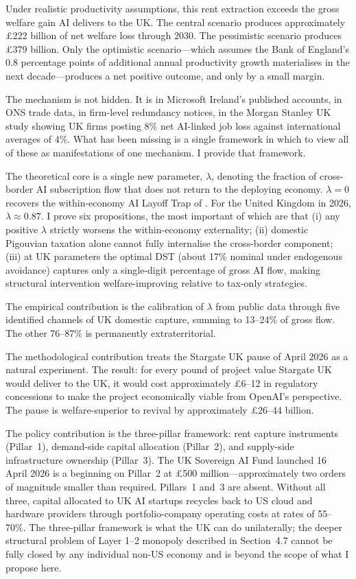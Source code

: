 \documentclass[11pt,letterpaper]{article}
\theoremstyle{remark}
\begin{document}
Under realistic productivity assumptions, this rent extraction exceeds the gross welfare gain {AI} delivers to the {UK}. The central scenario produces approximately \pounds222 billion of net welfare loss through 2030. The pessimistic scenario produces \pounds379 billion. Only the optimistic scenario---which assumes the Bank of England's 0.8 percentage points of additional annual productivity growth materialises in the next decade---produces a net positive outcome, and only by a small margin.

The mechanism is not hidden. It is in Microsoft Ireland's published accounts, in {ONS} trade data, in firm-level redundancy notices, in the Morgan Stanley {UK} study showing {UK} firms posting 8\% net {AI}-linked job loss against international averages of 4\%. What has been missing is a single framework in which to view all of these as manifestations of one mechanism. I provide that framework.

The theoretical core is a single new parameter, $\lambda$, denoting the fraction of cross-border {AI} subscription flow that does not return to the deploying economy. $\lambda = 0$ recovers the within-economy {AI} Layoff Trap of \citet{hemenway_falk_tsoukalas_2026}. For the United Kingdom in 2026, $\lambda \approx 0.87$. I prove six propositions, the most important of which are that (i) any positive $\lambda$ strictly worsens the within-economy externality; (ii) domestic Pigouvian taxation alone cannot fully internalise the cross-border component; (iii) at {UK} parameters the optimal {DST} (about 17\% nominal under endogenous avoidance) captures only a single-digit percentage of gross {AI} flow, making structural intervention welfare-improving relative to tax-only strategies.

The empirical contribution is the calibration of $\lambda$ from public data through five identified channels of {UK} domestic capture, summing to 13--24\% of gross flow. The other 76--87\% is permanently extraterritorial.

The methodological contribution treats the Stargate {UK} pause of April 2026 as a natural experiment. The result: for every pound of project value Stargate {UK} would deliver to the {UK}, it would cost approximately \pounds6--12 in regulatory concessions to make the project economically viable from OpenAI's perspective. The pause is welfare-superior to revival by approximately \pounds26--44 billion.

The policy contribution is the three-pillar framework: rent capture instruments (Pillar~1), demand-side capital allocation (Pillar~2), and supply-side infrastructure ownership (Pillar~3). The {UK} Sovereign {AI} Fund launched 16 April 2026 is a beginning on Pillar~2 at \pounds500 million---approximately two orders of magnitude smaller than required. Pillars~1 and~3 are absent. Without all three, capital allocated to {UK} {AI} startups recycles back to {US} cloud and hardware providers through portfolio-company operating costs at rates of 55--70\%. The three-pillar framework is what the {UK} can do unilaterally; the deeper structural problem of Layer 1--2 monopoly described in Section~4.7 cannot be fully closed by any individual non-{US} economy and is beyond the scope of what I propose here.
\end{document}
